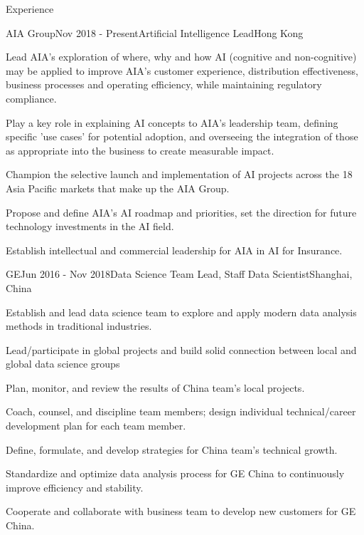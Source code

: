 \documentclass{resume} %
\begin{document}
\begin{rSection}{Experience}

\begin{rSubsection}{AIA Group}{Nov 2018 - Present}{Artificial Intelligence Lead}{Hong Kong}
\item Lead AIA's exploration of where, why and how AI (cognitive and non-cognitive) may be applied to improve AIA's customer experience, distribution effectiveness, business processes and operating efficiency, while maintaining regulatory compliance.
\item Play a key role in explaining AI concepts to AIA's leadership team, defining specific 'use cases' for potential adoption, and overseeing the integration of those as appropriate into the business to create measurable impact.
\item Champion the selective launch and implementation of AI projects across the 18 Asia Pacific markets that make up the AIA Group.
\item Propose and define AIA's AI roadmap and priorities, set the direction for future technology investments in the AI field.
\item Establish intellectual and commercial leadership for AIA in AI for Insurance.
\end{rSubsection}


\begin{rSubsection}{GE}{Jun 2016 - Nov 2018}{Data Science Team Lead, Staff Data Scientist}{Shanghai, China}
\item Establish and lead data science team to explore and apply modern data analysis methods in traditional industries.
\item Lead/participate in global projects and build solid connection between local and global data science groups
\item Plan, monitor, and review the results of China team's local projects.
\item Coach, counsel, and discipline team members; design individual technical/career development plan for each team member.
\item Define, formulate, and develop strategies for China team's technical growth.
\item Standardize and optimize data analysis process for GE China to continuously improve efficiency and stability.
\item Cooperate and collaborate with business team to develop new customers for GE China.
\end{rSubsection}


\end{rSection}
\end{document}
